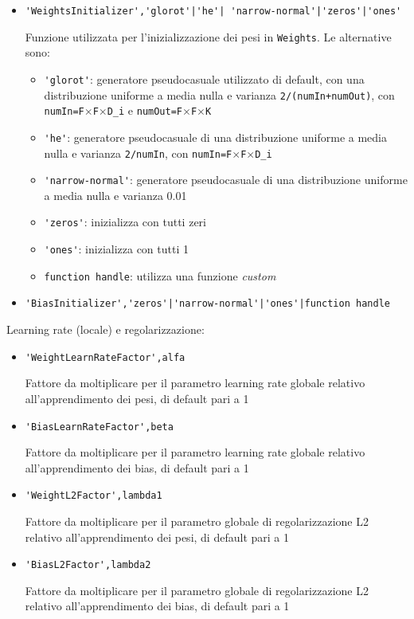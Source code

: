 \begin{itemize}
	\item \verb+'WeightsInitializer','glorot'|'he'| 'narrow-normal'|'zeros'|'ones'+
	
	Funzione utilizzata per l'inizializzazione dei pesi in \verb|Weights|. Le alternative sono:
	
	\begin{itemize}
		\item \verb|'glorot'|: generatore pseudocasuale utilizzato di default, con una distribuzione uniforme a media nulla e varianza \verb|2/(numIn+numOut)|, con \verb|numIn=F|$\times$\verb|F|$\times$\verb|D_i| e \verb|numOut=F|$\times$\verb|F|$\times$\verb|K|
		
		\item \verb|'he'|: generatore pseudocasuale di una distribuzione uniforme a media nulla e varianza \verb|2/numIn|, con \verb|numIn=F|$\times$\verb|F|$\times$\verb|D_i|
		
		\item \verb|'narrow-normal'|: generatore pseudocasuale di una distribuzione uniforme a media nulla e varianza 0.01
		
		\item \verb|'zeros'|: inizializza con tutti zeri
		
		\item \verb|'ones'|: inizializza con tutti 1
		
		\item \verb|function handle|: utilizza una funzione \textit{custom}
		
	\end{itemize}
	
	\item \verb+'BiasInitializer','zeros'|'narrow-normal'|'ones'|function handle+
	
\end{itemize}

Learning rate (locale) e regolarizzazione:

\begin{itemize}
	\item \verb|'WeightLearnRateFactor',alfa|
	
	Fattore da moltiplicare per il parametro learning rate globale relativo all'apprendimento dei pesi, di default pari a 1
	
	\item \verb|'BiasLearnRateFactor',beta|
	
	Fattore da moltiplicare per il parametro learning rate globale relativo all'apprendimento dei bias, di default pari a 1
	
	\item \verb|'WeightL2Factor',lambda1|
	
	Fattore da moltiplicare per il parametro globale di regolarizzazione L2 relativo all'apprendimento dei pesi, di default pari a 1
	
	\item \verb|'BiasL2Factor',lambda2|
	
	Fattore da moltiplicare per il parametro globale di regolarizzazione L2 relativo all'apprendimento dei bias, di default pari a 1
	
\end{itemize}

